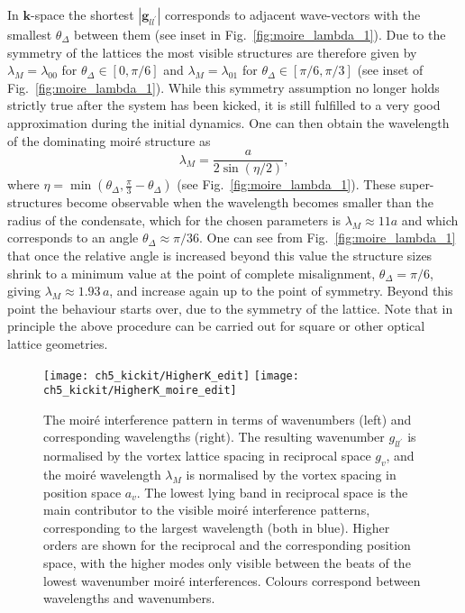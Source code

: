 In $\mathbf{k}$-space the shortest $|\mathbf{g}_{ll^\prime}|$ corresponds to adjacent wave-vectors with the smallest $\theta_\Delta$ between them (see inset in Fig.~\ref{fig:moire_lambda_1}). Due to the symmetry of the lattices the most visible structures are therefore given by $\lambda_M=\lambda_{00}$ for $\theta_\Delta\in[0,\pi/6]$ and $\lambda_M=\lambda_{01}$ for $\theta_\Delta\in[\pi/6,\pi/3]$ (see inset of Fig.~\ref{fig:moire_lambda_1}).
While this symmetry assumption no longer holds strictly true after the system has been kicked, it is still fulfilled to a very good approximation during the initial dynamics. One can then obtain the wavelength of the dominating moir\'e structure as~\cite{BIO:Blair_jneur_2007,SS:Yankowitz_natphys_2012}
    	\begin{equation}
    		\lambda_M = \frac{a}{2\sin(\eta/2)},
    		\label{eqn:moire_size}
    	\end{equation}
    where $\eta=\min(\theta_\Delta,\frac{\pi}{3} - \theta_\Delta ) $  (see Fig.~\ref{fig:moire_lambda_1}).
These super-structures become observable when the wavelength becomes smaller than the radius of the condensate, which for the chosen parameters is $\lambda_M \approx 11a$ and which corresponds to an angle $\theta_\Delta \approx \pi/36$.
One can see from Fig.~\ref{fig:moire_lambda_1} that once the relative angle is increased beyond this value the structure sizes shrink to a minimum value at the point of complete misalignment, $\theta_\Delta=\pi/6$, giving $\lambda_M\approx 1.93\,a$, and increase again up to the point of symmetry. Beyond this point the behaviour starts over, due to the symmetry of the lattice. Note that in principle the above procedure can be carried out for square or other optical lattice geometries.

\begin{figure}
    \centering
    \texttt{[image: ch5\_kickit/HigherK\_edit]}
    \texttt{[image: ch5\_kickit/HigherK\_moire\_edit]}
    \caption[The moir\'e interference pattern in terms of wavenumbers.]{The moir\'e interference pattern in terms of wavenumbers (left) and corresponding wavelengths (right). The resulting wavenumber $g_{ll^{\prime}}$ is normalised by the vortex lattice spacing in reciprocal space $g_v$, and the moir\'e wavelength $\lambda_M$ is normalised by the vortex spacing in position space $a_v$. The lowest lying band in reciprocal space is the main contributor to the visible moir\'e interference patterns, corresponding to the largest wavelength (both in blue). Higher orders are shown for the reciprocal and the corresponding position space, with the higher modes only visible between the beats of the lowest wavenumber moir\'e interferences. Colours correspond between wavelengths and wavenumbers.}\label{fig:moire_higher}
\end{figure}

